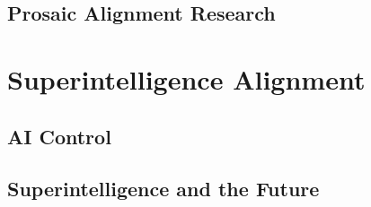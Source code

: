 


\subsection{Prosaic Alignment Research}

\section{Superintelligence Alignment}

\subsection{AI Control}

\subsection{Superintelligence and the Future}
